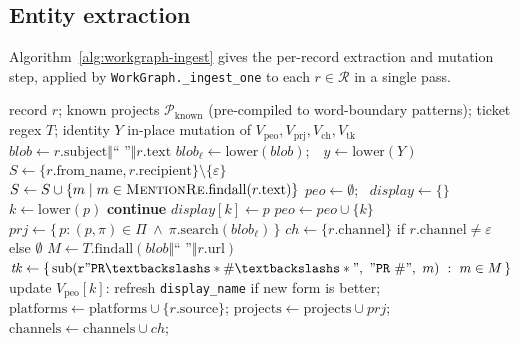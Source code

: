 \subsection{Entity extraction}
\label{sec:workgraph-alg}

Algorithm~\ref{alg:workgraph-ingest} gives the per-record extraction and mutation step, applied by \texttt{WorkGraph.\_ingest\_one} to each $r \in \mathcal{R}$ in a single pass.

\begin{algorithm}[t]
\caption{WorkGraph ingest: single record}
\label{alg:workgraph-ingest}
\begin{algorithmic}[1]
\Require record $r$; known projects $\mathcal{P}_{\text{known}}$ (pre-compiled to word-boundary patterns); ticket regex $T$; identity $Y$
\Ensure in-place mutation of $V_{\mathrm{peo}}, V_{\mathrm{prj}}, V_{\mathrm{ch}}, V_{\mathrm{tk}}$
\State $\mathit{blob} \gets r.\mathrm{subject} \Vert \text{`` ''} \Vert r.\mathrm{text}$
\State $\mathit{blob}_\ell \gets \mathrm{lower}(\mathit{blob})$;\ \ $y \gets \mathrm{lower}(Y)$
\Statex {}
\State $S \gets \{r.\mathrm{from\_name}, r.\mathrm{recipient}\} \setminus \{\varepsilon\}$ 
\State $S \gets S \cup \{m \mid m \in \textsc{MentionRe}.\mathrm{findall}(r.\mathrm{text})\}$
\State $\mathit{peo} \gets \emptyset$; \ $\mathit{display} \gets \{\}$ 
  \State $k \gets \mathrm{lower}(p)$
   \textbf{continue} \EndIf
    \State $\mathit{display}[k] \gets p$
  \EndIf
  \State $\mathit{peo} \gets \mathit{peo} \cup \{k\}$
\EndFor
\Statex {}
\State $\mathit{prj} \gets \{\, p : (p, \pi) \in \Pi \ \land\ \pi.\mathrm{search}(\mathit{blob}_\ell) \,\}$
\Statex {}
\State $\mathit{ch} \gets \{r.\mathrm{channel}\}$ if $r.\mathrm{channel} \neq \varepsilon$ else $\emptyset$
\Statex {}
\State $M \gets T.\mathrm{findall}(\mathit{blob} \Vert \text{`` ''} \Vert r.\mathrm{url})$
\State $\mathit{tk} \gets \{\, \mathrm{sub}(\mathtt{r"PR\textbackslash s*\#\textbackslash s*"},\ \mathtt{"PR\ \#"},\ m)\ :\ m \in M\, \}$
\Statex {}
  \State update $V_{\mathrm{peo}}[k]$: refresh \texttt{display\_name} if new form is better; $\mathrm{platforms} \gets \mathrm{platforms} \cup \{r.\mathrm{source}\}$;
  \Statex\hspace{2em}$\mathrm{projects} \gets \mathrm{projects} \cup \mathit{prj}$;\ \ $\mathrm{channels} \gets \mathrm{channels} \cup \mathit{ch}$;

\end{algorithmic}
\end{algorithm}
